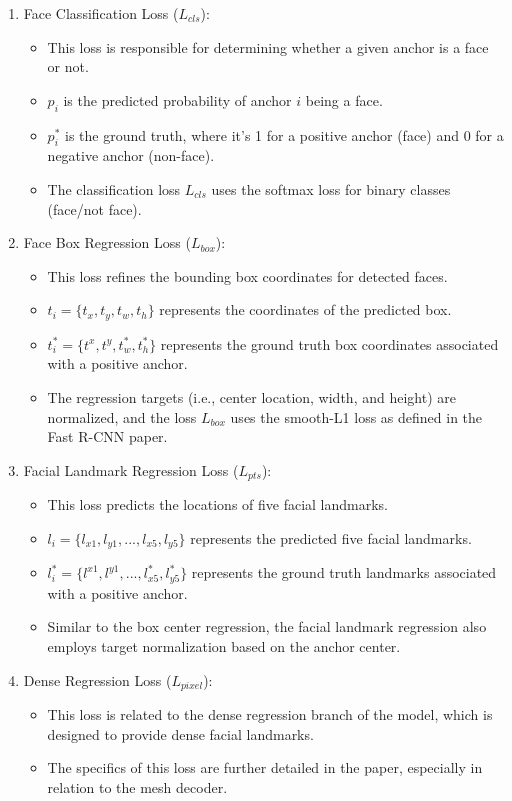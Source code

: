 \documentclass{article}
\begin{document}
\begin{enumerate}
  \item Face Classification Loss (\(L_{cls}\)):
  \begin{itemize}
    \item This loss is responsible for determining whether a given anchor is a face or not.
    \item \( p_i \) is the predicted probability of anchor \( i \) being a face.
    \item \( p^*_i \) is the ground truth, where it's 1 for a positive anchor (face) and 0 for a negative anchor (non-face).
    \item The classification loss \( L_{cls} \) uses the softmax loss for binary classes (face/not face).
  \end{itemize}
    \item Face Box Regression Loss (\(L_{box}\)):
    \begin{itemize}
      \item This loss refines the bounding box coordinates for detected faces.
      \item \( t_i = \{t_{x}, t_{y}, t_{w}, t_{h}\} \) represents the coordinates of the predicted box.
      \item \( t^*_i = \{t^{x}, t^{y}, t^*_{w}, t^*_{h}\} \) represents the ground truth box coordinates associated with a positive anchor.
      \item The regression targets (i.e., center location, width, and height) are normalized, and the loss \( L_{box} \) uses the smooth-L1 loss as defined in the Fast R-CNN paper.
    \end{itemize}
    \item Facial Landmark Regression Loss (\(L_{pts}\)):
    \begin{itemize}
      \item This loss predicts the locations of five facial landmarks.
      \item \( l_i = \{l_{x1}, l_{y1}, ..., l_{x5}, l_{y5}\} \) represents the predicted five facial landmarks.
      \item \( l^*_i = \{l^{x1}, l^{y1}, ..., l^*_{x5}, l^*_{y5}\} \) represents the ground truth landmarks associated with a positive anchor.
    \item Similar to the box center regression, the facial landmark regression also employs target normalization based on the anchor center.
    \end{itemize}
    \item Dense Regression Loss (\(L_{pixel}\)):
    \begin{itemize}
      \item This loss is related to the dense regression branch of the model, which is designed to provide dense facial landmarks.
      \item The specifics of this loss are further detailed in the paper, especially in relation to the mesh decoder.
    \end{itemize}
  \end{enumerate}
\end{document}
